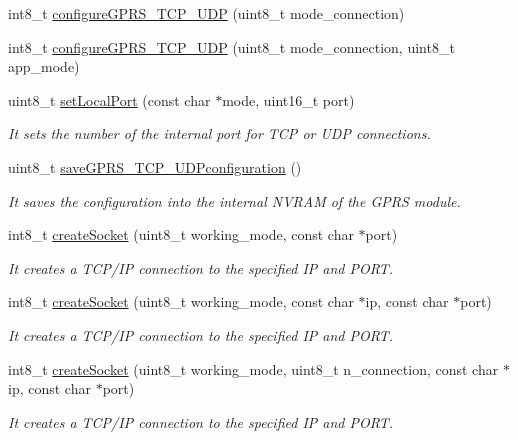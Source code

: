 \begin{DoxyCompactItemize}
\item 
int8\+\_\+t \hyperlink{class_wasp_g_p_r_s___pro__core_a9a0b42f7303601eea426007eeb5588c5}{configure\+G\+P\+R\+S\+\_\+\+T\+C\+P\+\_\+\+U\+DP} (uint8\+\_\+t mode\+\_\+connection)
\item 
int8\+\_\+t \hyperlink{class_wasp_g_p_r_s___pro__core_afa42c6fd242fbdc25de03dc6b0dbe89c}{configure\+G\+P\+R\+S\+\_\+\+T\+C\+P\+\_\+\+U\+DP} (uint8\+\_\+t mode\+\_\+connection, uint8\+\_\+t app\+\_\+mode)
\item 
uint8\+\_\+t \hyperlink{class_wasp_g_p_r_s___pro__core_a302da2efcd5c3924d5bcb514fc677967}{set\+Local\+Port} (const char $\ast$mode, uint16\+\_\+t port)
\begin{DoxyCompactList}\small\item\em It sets the number of the internal port for T\+CP or U\+DP connections. \end{DoxyCompactList}\item 
uint8\+\_\+t \hyperlink{class_wasp_g_p_r_s___pro__core_ae8fdf05f78ad63fad18aea3d2be537c9}{save\+G\+P\+R\+S\+\_\+\+T\+C\+P\+\_\+\+U\+D\+Pconfiguration} ()
\begin{DoxyCompactList}\small\item\em It saves the configuration into the internal N\+V\+R\+AM of the G\+P\+RS module. \end{DoxyCompactList}\item 
int8\+\_\+t \hyperlink{class_wasp_g_p_r_s___pro__core_a31d09c2f2a363555e612185f6c710caf}{create\+Socket} (uint8\+\_\+t working\+\_\+mode, const char $\ast$port)
\begin{DoxyCompactList}\small\item\em It creates a T\+C\+P/\+IP connection to the specified IP and P\+O\+RT. \end{DoxyCompactList}\item 
int8\+\_\+t \hyperlink{class_wasp_g_p_r_s___pro__core_a729c4b7347826a4f570fe1c43e0eedfc}{create\+Socket} (uint8\+\_\+t working\+\_\+mode, const char $\ast$ip, const char $\ast$port)
\begin{DoxyCompactList}\small\item\em It creates a T\+C\+P/\+IP connection to the specified IP and P\+O\+RT. \end{DoxyCompactList}\item 
int8\+\_\+t \hyperlink{class_wasp_g_p_r_s___pro__core_a71e4fcb0e8aaa72055298914e372ebfc}{create\+Socket} (uint8\+\_\+t working\+\_\+mode, uint8\+\_\+t n\+\_\+connection, const char $\ast$ip, const char $\ast$port)
\begin{DoxyCompactList}\small\item\em It creates a T\+C\+P/\+IP connection to the specified IP and P\+O\+RT. \end{DoxyCompactList}\item 

\end{DoxyCompactItemize}
